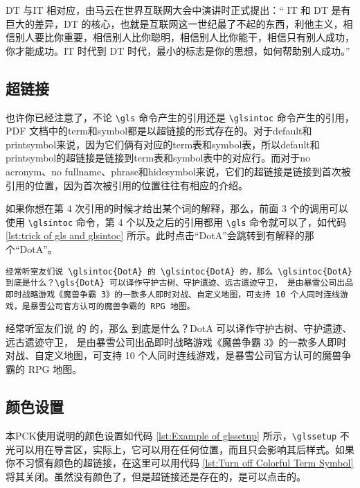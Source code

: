 \documentclass{article}
\begin{document}
\gls{DT} 与\gls{IT} 相对应，由马云在世界互联网大会中演讲时正式提出：`` \gls{IT} 和 \gls{DT} 是有巨大的差异，\gls{DT} 的核心，也就是互联网这一世纪最了不起的东西，利他主义，相信别人要比你重要，相信别人比你聪明，相信别人比你能干，相信只有别人成功，你才能成功。\gls{IT} 时代到 \gls{DT} 时代，最小的标志是你的思想，如何帮助别人成功。''

\subsection{超链接}
也许你已经注意了，不论 \lstinline{\gls} 命令产生的引用还是 \lstinline{\glsintoc} 命令产生的引用，PDF 文档中的\gls{term}和\gls{symbol}都是以超链接的形式存在的。对于\gls{default}和\gls{printsymbol}来说，因为它们俩有对应的\gls{term}表和\gls{symbol}表，所以\gls{default}和\gls{printsymbol}的超链接是链接到\gls{term}表和\gls{symbol}表中的对应行。而对于\gls{no acronym}、\gls{no fullname}、\gls{phrase}和\gls{hidesymbol}来说，它们的超链接是链接到首次被引用的位置，因为首次被引用的位置往往有相应的介绍。

如果你想在第 4 次引用的时候才给出某个词的解释，那么，前面 3 个的调用可以使用 \lstinline{\glsintoc} 命令，第 4 个以及之后的引用都用 \lstinline{\gls} 命令就可以了，如代码 \ref{lst:trick of gls and glsintoc} 所示。此时点击``DotA''会跳转到有解释的那个``DotA''。
\begin{lstlisting}[style      = latexcode,
                   caption    = {\texttt{\backslash gls} 与 \texttt{\backslash glsintoc} 的灵活使用},
                   label      = {lst:trick of gls and glsintoc}]
经常听室友们说 \glsintoc{DotA} 的 \glsintoc{DotA} 的，那么 \glsintoc{DotA} 到底是什么？\gls{DotA} 可以译作守护古树、守护遗迹、远古遗迹守卫， 是由暴雪公司出品即时战略游戏《魔兽争霸 3》的一款多人即时对战、自定义地图，可支持 10 个人同时连线游戏，是暴雪公司官方认可的魔兽争霸的 RPG 地图。
\end{lstlisting}

经常听室友们说  的  的，那么  到底是什么？\gls{DotA} 可以译作守护古树、守护遗迹、远古遗迹守卫， 是由暴雪公司出品即时战略游戏《魔兽争霸 3》的一款多人即时对战、自定义地图，可支持 10 个人同时连线游戏，是暴雪公司官方认可的魔兽争霸的 RPG 地图。

\subsection{颜色设置}
本\gls{PCK}使用说明的颜色设置如代码 \ref{lst:Example of glssetup} 所示，\lstinline{\glssetup} 不光可以用在导言区，实际上，它可以用在任何位置，而且只会影响其后样式。如果你不习惯有颜色的超链接，在这里可以用代码 \ref{lst:Turn off Colorful Term Symbol} 将其关闭。虽然没有颜色了，但是超链接还是存在的，是可以点击的。
\end{document}
